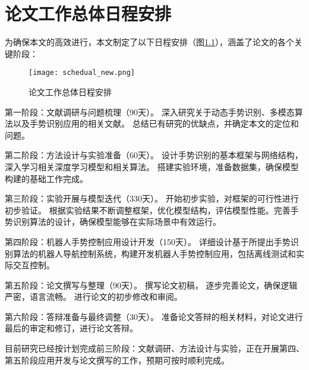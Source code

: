 
\chapter{论文工作总体日程安排}

为确保本文的高效进行，本文制定了以下日程安排（图\ref{fig:schedual}），涵盖了论文的各个关键阶段：
\begin{figure}
  \centering
  \texttt{[image: schedual\_new.png]}
  \caption{论文工作总体日程安排}
  \label{fig:schedual}
\end{figure}

第一阶段：文献调研与问题梳理（90天）。
深入研究关于动态手势识别、多模态算法以及手势识别应用的相关文献。
总结已有研究的优缺点，并确定本文的定位和问题。

第二阶段：方法设计与实验准备（60天）。
设计手势识别的基本框架与网络结构，深入学习相关深度学习模型和相关算法。
搭建实验环境，准备数据集，确保模型构建的基础工作完成。

第三阶段：实验开展与模型迭代（330天）。
开始初步实验，对框架的可行性进行初步验证。
根据实验结果不断调整框架，优化模型结构，评估模型性能。完善手势识别算法的设计，确保模型能够在实际场景中有效运行。

第四阶段：机器人手势控制应用设计开发（150天）。
详细设计基于所提出手势识别算法的机器人导航控制系统，构建开发机器人手势控制应用，包括离线测试和实际交互控制。

第五阶段：论文撰写与整理（90天）。
撰写论文初稿，%
逐步完善论文，确保逻辑严密，语言流畅。
进行论文的初步修改和审阅。

第六阶段：答辩准备与最终调整（30天）。
准备论文答辩的相关材料，对论文进行最后的审定和修订，进行论文答辩。

目前研究已经按计划完成前三阶段：文献调研、方法设计与实验，正在开展第四、第五阶段应用开发与论文撰写的工作，预期可按时顺利完成。




